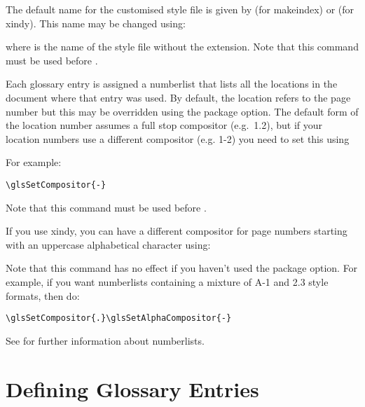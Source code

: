 \documentclass[report]{nlctdoc}
\begin{document}
The default name for the customised style file is given by
 (for \gls{makeindex}) or 
 (for \gls{xindy}). This name may be
changed using:
\begin{definition}[\DescribeMacro{\setStyleFile}]
\end{definition}
where  is the name of the style file without the 
extension. Note that this command must be used before
.

Each glossary entry is assigned a \gls{numberlist} that lists all 
the locations in the document where that entry was used. By default,
the location refers to the page number but this may be overridden
using the  package option. The default form of
the location number assumes a full stop compositor (e.g.\ 1.2),
but if your location numbers use a different compositor (e.g. 1-2)
you need to set this using
\begin{definition}[\DescribeMacro{\glsSetCompositor}]
\end{definition}
For example:
\begin{verbatim}
\glsSetCompositor{-}
\end{verbatim}
Note that this command must be used before .

If you use \gls{xindy}, you can have a different compositor for page
numbers starting with an uppercase alphabetical character using:
\begin{definition}[\DescribeMacro{\glsSetAlphaCompositor}]
\end{definition}
Note that this command has no effect if you haven't used the
 package option. For example, if you want 
\glspl{numberlist} containing a mixture of A-1 and 2.3 style
formats, then do:
\begin{verbatim}
\glsSetCompositor{.}\glsSetAlphaCompositor{-}
\end{verbatim}
See  for further information about
\glspl{numberlist}.

\chapter{Defining Glossary Entries}
\label{sec:newglosentry}
\end{document}
